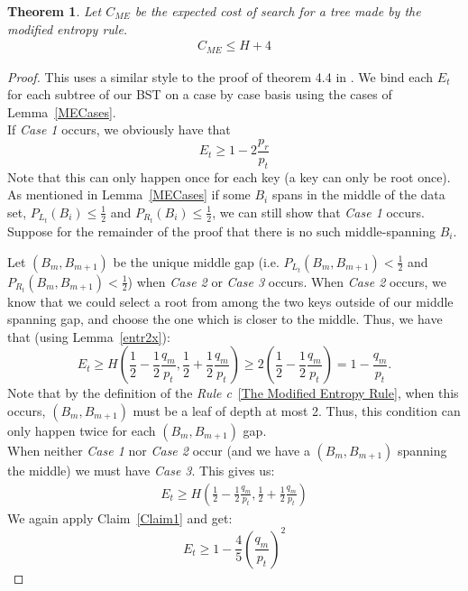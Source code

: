 \documentclass[letterpaper,12pt,titlepage,oneside,final]{book}
\theoremstyle{plain}
\newtheorem{thm}{Theorem}[section]
\begin{document}
\begin{thm}
Let $C_{ME}$ be the expected cost of search for a tree made by the modified entropy rule.
\begin{align*}
C_{ME} \leq H + 4
\end{align*}
\end{thm}

\begin{proof}
This uses a similar style to the proof of theorem 4.4 in \cite{bayer1975improved}.
We bind each $E_t$ for each subtree of our BST on a case by case basis using the cases of Lemma~\ref{MECases}.\\
If \textit{Case 1} occurs, we obviously have that
\begin{equation}\label{EQC1}
E_t \geq 1-2 \frac{p_r}{p_t}
\end{equation}
Note that this can only happen once for each key (a key can only be root once). \\

As mentioned in Lemma~\ref{MECases} if some $B_i$ spans in the middle of the data set, $P_{L_t}(B_i) \leq \frac{1}{2}$ and $P_{R_t}(B_i) \leq \frac{1}{2}$, we can still show that \textit{Case 1} occurs. Suppose for the remainder of the proof that there is no such middle-spanning $B_i$.

Let $(B_m, B_{m+1})$ be the unique middle gap (i.e. $P_{L_t}(B_m, B_{m+1}) < \frac{1}{2}$ and $P_{R_t}(B_m, B_{m+1}) < \frac{1}{2}$) when \textit{Case 2} or \textit{Case 3} occurs. When \textit{Case 2} occurs, we know that we could select a root from among the two keys outside of our middle spanning gap, and choose the one which is closer to the middle. Thus, we have that (using Lemma~\ref{entr2x}):
\begin{equation}\label{EQC2} 
E_t \geq H(\frac{1}{2}-\frac{1}{2} \frac{q_m}{p_t}, \frac{1}{2} + \frac{1}{2} \frac{q_m}{p_t}) \geq 2(\frac{1}{2}-\frac{1}{2} \frac{q_m}{p_t})=1-\frac{q_m}{p_t}.
\end{equation}
Note that by the definition of the \textit{Rule c}~\ref{The Modified Entropy Rule}, when this occurs, $(B_m, B_{m+1})$ must be a leaf of depth at most 2. Thus, this condition can only happen twice for each $(B_m, B_{m+1})$ gap. \\

When neither \textit{Case 1} nor \textit{Case 2} occur (and we have a $(B_m, B_{m+1})$ spanning the middle) we must have \textit{Case 3}. This gives us:
\begin{align*}
E_t \geq H(\frac{1}{2}-\frac{1}{2} \frac{q_m}{p_t}, \frac{1}{2} + \frac{1}{2} \frac{q_m}{p_t})
\end{align*}
We again apply Claim~\ref{Claim1} and get:
\begin{equation}\label{EQC3}
E_t \geq 1- \frac{4}{5} (\frac{q_m}{p_t})^2
\end{equation}


\end{proof}
\end{document}
